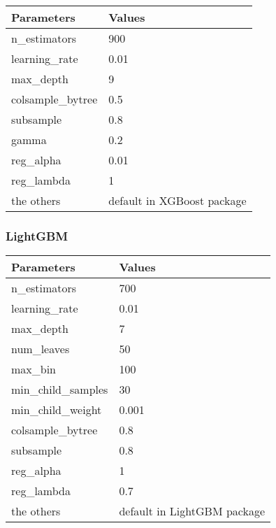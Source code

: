 \documentclass[review]{elsarticle}
\begin{document}
\begin{table}[H]
    \begin{tabular}{|m{9em}|m{14em}|}
    \hline
    \textbf{Parameters} & \textbf{Values} \\ \hline
    n\_estimators & 900 \\ \hline
    learning\_rate & 0.01 \\ \hline
    max\_depth & 9 \\ \hline
    colsample\_bytree & 0.5 \\ \hline
    subsample & 0.8 \\ \hline
    gamma & 0.2 \\ \hline
    reg\_alpha & 0.01 \\ \hline
    reg\_lambda & 1 \\ \hline
    the others & default in XGBoost package \\ \hline
    \end{tabular}
\end{table}

\subsubsection{LightGBM}

\begin{table}[H]
    \begin{tabular}{|m{9em}|m{14em}|}
    \hline
    \textbf{Parameters} & \textbf{Values} \\ \hline
    n\_estimators & 700 \\ \hline
    learning\_rate & 0.01 \\ \hline
    max\_depth & 7 \\ \hline
    num\_leaves & 50 \\ \hline
    max\_bin & 100 \\ \hline
    min\_child\_samples & 30 \\ \hline
    min\_child\_weight & 0.001 \\ \hline
    colsample\_bytree & 0.8 \\ \hline
    subsample & 0.8 \\ \hline
    reg\_alpha & 1 \\ \hline
    reg\_lambda & 0.7 \\ \hline
    the others & default in LightGBM package \\ \hline
    \end{tabular}
\end{table}
\end{document}
